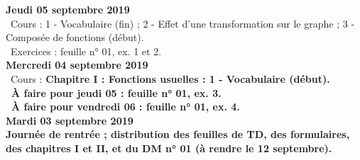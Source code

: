\documentclass[12pt,a4paper]{article}
\begin{document}
\noindent\textbf{\bf Jeudi 05 septembre 2019}\\
\bu\ Cours : 1 - Vocabulaire (fin) ; 2 - Effet d'une transformation sur le graphe ; 3 - Composée de fonctions 
(début).\\
\bu\ Exercices : feuille n° 01, ex. 1 et 2.\vspace{.4cm}\\
     
\noindent\textbf{\bf Mercredi 04 septembre 2019}\\
\bu\ Cours : \bf Chapitre I \rm : Fonctions usuelles : 1 - Vocabulaire (début).\\
\bu\ À faire pour jeudi 05 : feuille n° 01, ex. 3.\\
\bu\ À faire pour vendredi 06 : feuille n° 01, ex. 4.\vspace{.4cm}\\
 

\noindent\textbf{\bf Mardi 03 septembre 2019}\\
Journée de rentrée ; distribution des feuilles de TD, des formulaires, des
chapitres I et II, et du DM n° 01 (à rendre le 12 septembre).\vspace{.4cm}\\


\label{end}
\end{document}

